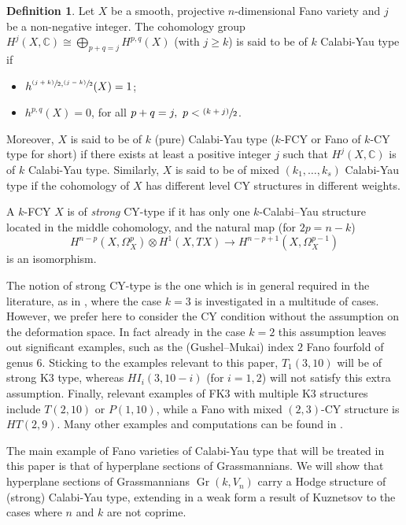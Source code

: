 \documentclass[JEP,XML,SOM,Unicode,NoEqCountersInSection]{cedram}
\newcommand{\psfrac}[2]{\sfrac{(#1)}{#2}}
\theoremstyle{plain}
\theoremstyle{definition}
\newtheorem{defin}[theorem]{Definition}
\DeclareMathOperator{\Gr}{Gr}
\newcommand{\CC}{\mathbb{C}}
\begin{document}
\begin{defin}\label{def:CYtype}
Let $X$ be a smooth, projective $n$-dimensional Fano variety and $j$ be a non-negative integer. The cohomology group $H^j(X, \CC) \cong \bigoplus_{p+q=j} H^{p,q}(X)$ (with $j \geq k$) is said to be of $k$ Calabi-Yau type if
\begin{itemize}
\item $h^{\psfrac{j+k}{2},\psfrac{j-k}{2}}(X)=1$;
\item $h^{p,q}(X)=0$, for all $p+q=j, \ p <\psfrac{k+j}{2}$.
\end{itemize}
Moreover, $X$ is said to be of $k$ (pure) Calabi-Yau type ($k$-FCY or Fano of $k$-CY type for short) if there exists at least a positive integer $j$ such that $H^j(X, \CC)$ is of $k$ Calabi-Yau type. Similarly, $X$ is said to be of mixed $(k_1, \ldots, k_s)$ Calabi-Yau type if the cohomology of $X$ has different level CY structures in different weights.

A $k$-FCY $X$ is of \emph{strong} CY-type if it has only one $k$-Calabi--Yau structure located in the middle cohomology, and the natural map (for $2p=n-k$)
\[
H^{n-p}(X,\Omega_X^p)\otimes H^1(X,TX)\to H^{n-p+1}(X,\Omega_X^{p-1})
\]
is an isomorphism.
\end{defin}

The notion of strong CY-type is the one which is in general required in the literature, as
in \cite{imcy}, where the case $k=3$ is investigated in a multitude of cases. However, we prefer here to consider the CY condition without the assumption on the deformation space.
In fact already in the case $k=2$ this assumption leaves out significant examples, such as the (Gushel--Mukai) index $2$ Fano fourfold of genus $6$.
Sticking to the examples relevant to this paper, $T_1(3,10)$ will be of strong K3 type, whereas $HI_i(3,10-i)$ (for $i=1,2$) will not satisfy this extra assumption. Finally, relevant examples of FK3 with multiple K3 structures include $T(2,10)$ or $P(1,10)$, while a Fano with mixed $(2,3)$-CY structure is $HT(2,9)$. Many other examples and computations can be found in \cite{fm}.

The main example of Fano varieties of Calabi-Yau type that will be treated in this paper is that
of hyperplane sections of Grassmannians.
We will show that hyperplane sections of Grassmannians $\Gr(k,V_n)$ carry a Hodge structure of (strong) Calabi-Yau type, extending in a weak form a result of Kuznetsov to the cases where $n$ and $k$ are not coprime.
\end{document}
